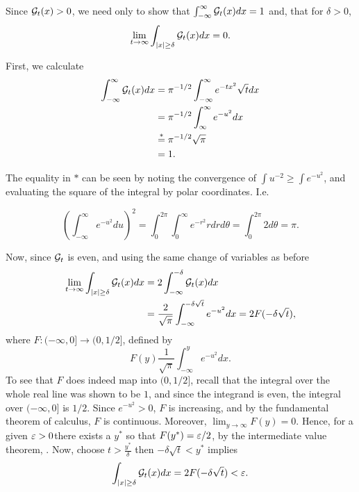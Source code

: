 \documentclass{homework}
\begin{document}
\begin{solution}
Since $\mathcal G_t(x) > 0$, we need only to show that $\int_{-\infty}^\infty \mathcal G_t(x)dx = 1$ and, that for $\delta > 0$,
$$
  \lim_{t\to\infty} \int_{|x|\ge \delta} \mathcal G_t(x)dx = 0.
$$

First, we calculate
\begin{align*}
  \int_{-\infty}^\infty \mathcal G_t(x) dx
  &= \pi^{-1/2} \int_{-\infty}^\infty e^{-tx^2} \sqrt{t}dx\\
  &=  \pi^{-1/2} \int_{\infty}^\infty e^{-u^2} dx\\
  &\stackrel *=  \pi^{-1/2} \sqrt{\pi}\\
  &= 1.
\end{align*}

The equality in $*$ can be seen by noting the convergence of $\int u^{-2} \ge \int e^{-u^2}$, and evaluating the square of the integral by polar coordinates.  I.e.

$$
  \left(\int_{-\infty}^{\infty}e^{-u^2}du\right)^2 = \int_0^{2\pi}\int_0^\infty e^{-r^2}rdrd\theta = \int_0^{2\pi}2d\theta = \pi.
$$

Now, since $\mathcal G_t$ is even, and using the same change of variables as before
\begin{align*}
  \lim_{t\to\infty} \int_{|x|\ge \delta} \mathcal G_t(x)dx 
  &= 2 \int_{-\infty}^{-\delta} \mathcal G_t(x)dx\\
  &= \frac 2{\sqrt \pi} \int_{-\infty}^{-\delta \sqrt t} e^{-u^2}dx = 2 F(-\delta \sqrt t),\\
\end{align*}
where $F:(-\infty,0] \to (0,1/2]$, defined by 
$$
  F(y) \frac 1{\sqrt \pi} \int_{-\infty}^{y} e^{-u^2}dx.
$$
To see that $F$ does indeed map into $(0,1/2]$, recall that the integral over
the whole real line was shown to be $1$, and since the integrand is even, the
integral over $(-\infty,0]$ is $1/2$. Since $e^{-u^2} > 0$, $F$ is increasing,
and by the fundamental theorem of calculus, $F$ is continuous.  Moreover, $\lim_{y\to\infty} F(y) = 0$.  Hence, for a given $\varepsilon > 0$there exists a $y^*$ so that $ F(y^*) = \varepsilon/2$, by the
intermediate value theorem, .
Now, choose $t > \frac{y^*}{\delta}$ then $-\delta \sqrt t < y^*$ implies 
$$
 \int_{|x| \ge \delta} \mathcal G_t(x) dx= 2 F(-\delta \sqrt t) < \varepsilon.
$$
\end{solution}

\end{document}
